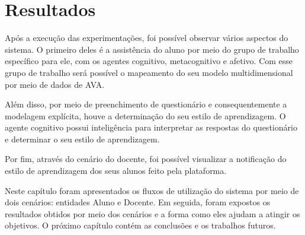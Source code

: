 \section{Resultados}\label{section:resultados}
Após a execução das experimentações, foi possível observar vários aspectos do sistema. O primeiro deles é a assistência do aluno por meio do grupo de trabalho específico para ele, com os agentes cognitivo, metacognitivo e afetivo. Com esse grupo de trabalho será possível o mapeamento do seu modelo multidimensional por meio de dados de AVA.

Além disso, por meio de preenchimento de questionário e consequentemente a modelagem explícita, houve a determinação do seu estilo de aprendizagem. O agente cognitivo possui inteligência para interpretar as respostas do questionário e determinar o seu estilo de aprendizagem.

Por fim, através do cenário do docente, foi possível visualizar a notificação do estilo de aprendizagem dos seus alunos feito pela plataforma.

Neste capítulo foram apresentados os fluxos de utilização do sistema por meio de dois cenários: entidades Aluno e Docente. Em seguida, foram expostos os resultados obtidos por meio dos cenários e a forma como eles ajudam a atingir os objetivos. O próximo capítulo contém as conclusões e os trabalhos futuros.

